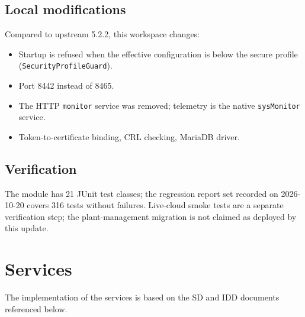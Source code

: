 \documentclass[a4paper]{arrowhead}
\begin{document}
\subsection{Local modifications}
\label{sec:local}

Compared to upstream 5.2.2, this workspace changes:
\begin{itemize}
  \item Startup is refused when the effective configuration is below the secure profile (\texttt{Security\allowbreak{}Profile\allowbreak{}Guard}).
  \item Port 8442 instead of 8465.
  \item The HTTP \texttt{monitor} service was removed; telemetry is the native \texttt{sysMonitor} service.
  \item Token-to-certificate binding, CRL checking, MariaDB driver.
\end{itemize}

\subsection{Verification}

The module has 21 JUnit test classes; the regression report set recorded on 2026-10-20 covers 316 tests without failures. Live-cloud smoke tests are a separate verification step; the plant-management migration is not claimed as deployed by this update.

\newpage

\section{Services}
\label{sec:services}

The implementation of the services is based on the SD and IDD documents referenced below.
\end{document}
